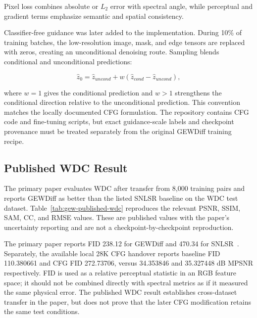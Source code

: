 \documentclass[10pt,twocolumn,letterpaper]{article}
\begin{document}
Pixel loss combines absolute or $L_2$ error with spectral angle, while perceptual and gradient terms emphasize semantic and spatial consistency.

Classifier-free guidance was later added to the implementation. During 10\% of training batches, the low-resolution image, mask, and edge tensors are replaced with zeros, creating an unconditional denoising route. Sampling blends conditional and unconditional predictions:

\begin{equation}
    \hat{z}_0=\hat{z}_{uncond}+w(\hat{z}_{cond}-\hat{z}_{uncond}),
\end{equation}

where $w=1$ gives the conditional prediction and $w>1$ strengthens the conditional direction relative to the unconditional prediction. This convention matches the locally documented CFG formulation. The repository contains CFG code and fine-tuning scripts, but exact guidance-scale labels and checkpoint provenance must be treated separately from the original GEWDiff training recipe.

\subsection{Published WDC Result}

The primary paper evaluates WDC after transfer from 8,000 training pairs and reports GEWDiff as better than the listed SNLSR baseline on the WDC test dataset. Table~\ref{tab:gew-published-wdc} reproduces the relevant PSNR, SSIM, SAM, CC, and RMSE values. These are published values with the paper's uncertainty reporting and are not a checkpoint-by-checkpoint reproduction.

\begin{table}[t]
\centering
\caption{Primary-paper WDC comparison.}
\label{tab:gew-published-wdc}
\small
{}
\end{table}

The primary paper reports FID 238.12 for GEWDiff and 470.34 for SNLSR~\cite{wang2026gew}. Separately, the available local 28K CFG handover reports baseline FID 110.380661 and CFG FID 272.73706, versus 34.353846 and 35.327448 dB MPSNR respectively. FID is used as a relative perceptual statistic in an RGB feature space; it should not be combined directly with spectral metrics as if it measured the same physical error. The published WDC result establishes cross-dataset transfer in the paper, but does not prove that the later CFG modification retains the same test conditions.
\end{document}

